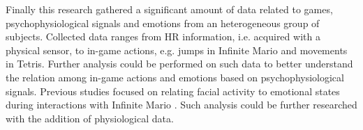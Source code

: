Finally this research gathered a significant amount of data related to games, psychophysiological signals and emotions from an heterogeneous group of subjects. Collected data ranges from HR information, i.e. acquired with a physical sensor, to in-game actions, e.g. jumps in Infinite Mario and movements in Tetris. Further analysis could be performed on such data to better understand the relation among in-game actions and emotions based on psychophysiological signals. Previous studies focused on relating facial activity to emotional states during interactions with Infinite Mario \parencite{shaker2011feature}. Such analysis could be further researched with the addition of physiological data.
